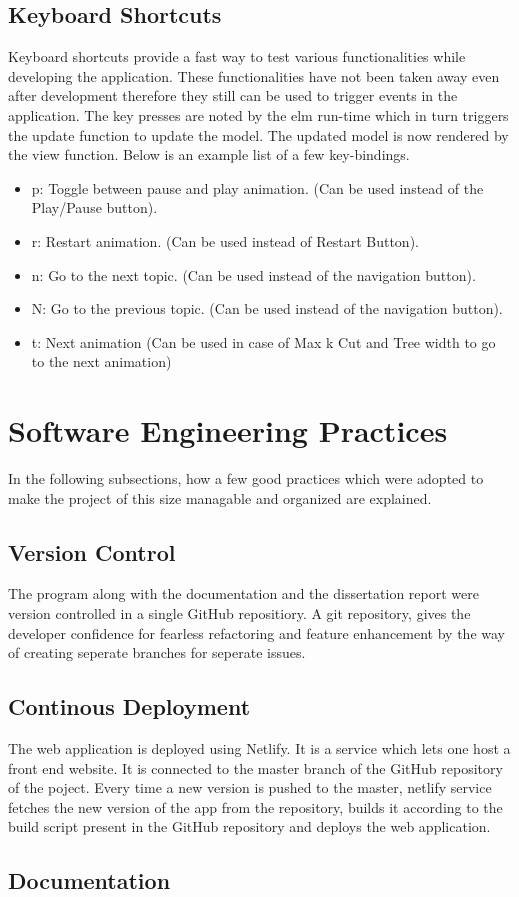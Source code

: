 \subsection{Keyboard Shortcuts}
Keyboard shortcuts provide a fast way to test various functionalities while
developing the application.  These functionalities have not been taken away
even after development therefore they still can be used to trigger events in
the application. 
The key presses are noted by the elm run-time which in turn triggers the update function
to update the model. The updated model is now rendered by the view function.
Below is an example list of a few key-bindings.
\begin{itemize}
\item p: Toggle between pause and play animation. (Can be used instead of the Play/Pause button).
\item r: Restart animation. (Can be used instead of Restart Button).
\item n: Go to the next topic. (Can be used instead of the navigation button).
\item N: Go to the previous topic. (Can be used instead of the navigation button).
\item t: Next animation (Can be used in case of Max k Cut and Tree width to go to the next animation)
\end{itemize}

\section{Software Engineering Practices}
In the following subsections, how a few good practices which were adopted to
make the project of this size managable and organized are explained.

\subsection{Version Control}
The program along with the documentation and the dissertation report were
version controlled in a single GitHub repositiory. A git repository, gives the
developer confidence for fearless refactoring and feature enhancement by the
way of creating seperate branches for seperate issues.

\subsection{Continous Deployment}
The web application is deployed using Netlify. It is a service which lets one
host a front end website.  It is connected to the master branch of the GitHub
repository of the poject. Every time a new version is pushed to the master,
netlify service fetches the new version of the app from the repository, builds
it according to the build script present in the GitHub repository and deploys
the web application.

\subsection{Documentation}

